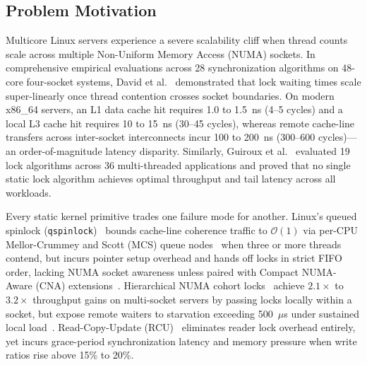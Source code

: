 \documentclass[conference]{IEEEtran}
\begin{document}
\subsection{Problem Motivation}
Multicore Linux servers experience a severe scalability cliff when thread counts scale across multiple Non-Uniform Memory Access (NUMA) sockets. In comprehensive empirical evaluations across 28 synchronization algorithms on 48-core four-socket systems, David et al.~\cite{david2013everything} demonstrated that lock waiting times scale super-linearly once thread contention crosses socket boundaries. On modern x86\_64 servers, an L1 data cache hit requires 1.0 to 1.5~ns (4--5 cycles) and a local L3 cache hit requires 10 to 15~ns (30--45 cycles), whereas remote cache-line transfers across inter-socket interconnects incur 100 to 200~ns (300--600 cycles)---an order-of-magnitude latency disparity. Similarly, Guiroux et al.~\cite{guiroux2016multicore} evaluated 19 lock algorithms across 36 multi-threaded applications and proved that no single static lock algorithm achieves optimal throughput and tail latency across all workloads.

Every static kernel primitive trades one failure mode for another. Linux's queued spinlock (\texttt{qspinlock})~\cite{long2014qspinlock} bounds cache-line coherence traffic to $\mathcal{O}(1)$ via per-CPU Mellor-Crummey and Scott (MCS) queue nodes~\cite{mellor1991algorithms,herlihy2020art} when three or more threads contend, but incurs pointer setup overhead and hands off locks in strict FIFO order, lacking NUMA socket awareness unless paired with Compact NUMA-Aware (CNA) extensions~\cite{dice2019cna,kashyap2019shfllock}. Hierarchical NUMA cohort locks~\cite{dice2012lock} achieve $2.1\times$ to $3.2\times$ throughput gains on multi-socket servers by passing locks locally within a socket, but expose remote waiters to starvation exceeding 500~$\mu$s under sustained local load~\cite{guiroux2016multicore}. Read-Copy-Update (RCU)~\cite{mckenney2021parallel,mckenney2020rcu} eliminates reader lock overhead entirely, yet incurs grace-period synchronization latency and memory pressure when write ratios rise above 15\% to 20\%.
\end{document}

